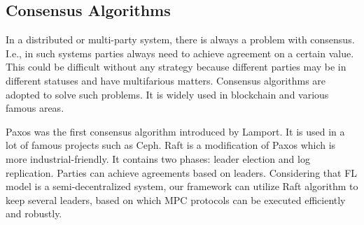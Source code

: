 \subsection{Consensus Algorithms}
In a distributed or multi-party system, there is always a problem with consensus. I.e., in such systems parties always need to achieve agreement on a certain value. This could be difficult without any strategy because different parties may be in different statuses and have multifarious matters. Consensus algorithms are adopted to solve such problems. It is widely used in blockchain and various famous areas.

Paxos was the first consensus algorithm introduced by Lamport\cite{Paxos}. It is used in a lot of famous projects such as Ceph\cite{Ceph}. Raft is a modification of Paxos which is more industrial-friendly\cite{Raft}. It contains two phases: leader election and log replication. Parties can achieve agreements based on leaders. Considering that FL model is a semi-decentralized system, our framework can utilize Raft algorithm to keep several leaders, based on which MPC protocols can be executed efficiently and robustly.
